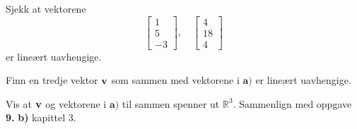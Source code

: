 




\begin{oppgave}

\begin{punkt}
Sjekk at vektorene $$\begin{bmatrix}
1\\
5\\
-3
\end{bmatrix}, \quad \begin{bmatrix}
4\\
18\\
4
\end{bmatrix}$$ er lineært uavhengige.
\end{punkt}

\begin{punkt}
Finn en tredje vektor $\mathbf{v}$ som sammen med vektorene i $\textbf{a)}$ er lineært uavhengige.
\end{punkt}


\begin{punkt}
Vis at $\mathbf{v}$ og vektorene i $\textbf{a)}$ til sammen spenner ut $\mathbb{R}^3$. Sammenlign med oppgave \textbf{9.} \textbf{b)} kapittel 3.
\end{punkt}

\end{oppgave}

